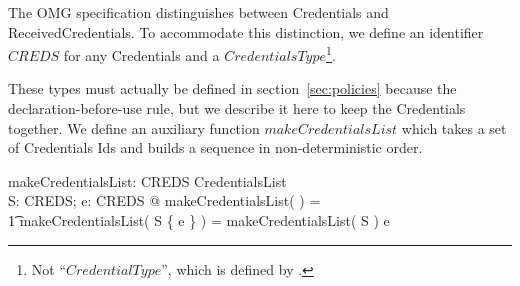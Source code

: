 The OMG specification distinguishes between Credentials and ReceivedCredentials.
To accommodate this distinction, we define an identifier $CREDS$ for any
Credentials and a $CredentialsType$\footnote{Not ``$CredentialType$'', which is
  defined by \corbasec.}.

These types must actually be defined in section~\ref{sec:policies} because the
declaration-before-use rule, but we describe it here to keep the Credentials
together.  
We define an auxiliary function $makeCredentialsList$ which takes a set of
Credentials Ids and builds a sequence in non-deterministic order.
\begin{axdef}
  makeCredentialsList: \power CREDS \fun CredentialsList \\
  \where
  \forall S: \power CREDS; e: CREDS @ makeCredentialsList( \emptyset ) = \langle
  \rangle \land \\
  \t1 makeCredentialsList( S \cup \{ e \} ) = makeCredentialsList( S ) \cat
  \langle e \rangle \\  
\end{axdef}

